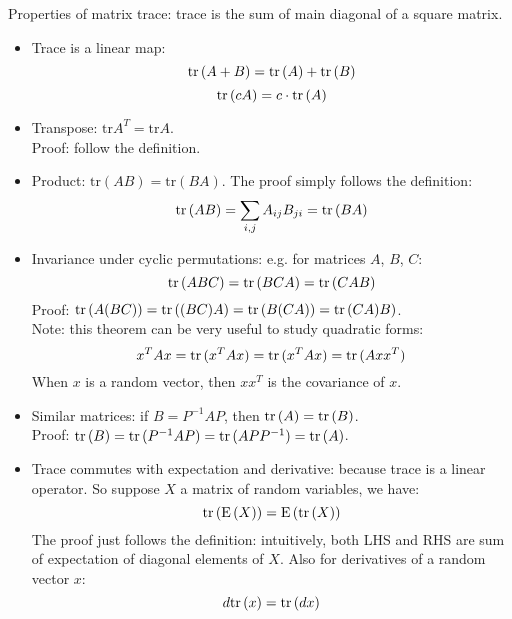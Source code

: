 \documentclass{report}
\begin{document}
Properties of matrix trace: trace is the sum of main diagonal of a square matrix. 
\begin{itemize}
	\item Trace is a linear map: 
	\begin{equation}
	{\rm tr}\,(A + B) = {\rm tr}\, (A) + {\rm tr}\, (B)
	\end{equation}
	\begin{equation}
	{\rm tr}\,(c A) = c \cdot {\rm tr}\, (A)	
	\end{equation}
	
	\item Transpose: $\text{tr}A^T = \text{tr}A$. \\
	Proof: follow the definition. 
	
	\item Product: $\text{tr} (AB) = \text{tr} (BA)$. The proof simply follows the definition: 
	\begin{equation}
	{\rm tr}\, (AB) = \sum_{i,j} A_{ij} B_{ji} = {\rm tr}\, (BA)	
	\end{equation}
	
	\item Invariance under cyclic permutations: e.g. for matrices $A$, $B$, $C$: 
	\begin{equation}
	{\rm tr}\,(ABC) = {\rm tr}\, (BCA) = {\rm tr}\, (CAB)
	\end{equation}
	Proof: ${\rm tr}\,(A(BC)) = {\rm tr}\,((BC)A) = {\rm tr}\,(B(CA)) = {\rm tr}\,(CA)B)$.\\
	Note: this theorem can be very useful to study quadratic forms: 
	\begin{equation}
	x^T A x = {\rm tr}\,(x^T A x) = {\rm tr}\,(x^T A x) = {\rm tr}\,(A x x^T)
	\end{equation}
	When $x$ is a random vector, then $x x^T$ is the covariance of $x$. 
	
	\item Similar matrices: if $B = P^{-1} A P$, then ${\rm tr}\,(A) = {\rm tr}\,(B)$. \\
	Proof: ${\rm tr}\,(B) = {\rm tr}\,(P^{-1} A P) = {\rm tr}\,(A P P^{-1}) = {\rm tr}\,(A)$. 
	
	\item Trace commutes with expectation and derivative: because trace is a linear operator. So suppose $X$ a matrix of random variables, we have: 
	\begin{equation}
	{\rm tr}\,({\rm E}\,(X)) = {\rm E}\,({\rm tr}\,(X))
	\end{equation}
	The proof just follows the definition: intuitively, both LHS and RHS are sum of expectation of diagonal elements of $X$. Also for derivatives of a random vector $x$: 
	\begin{equation}
	d {\rm tr}\,(x) = {\rm tr}\, (d x)
	\end{equation}
\end{itemize}
\end{document}

